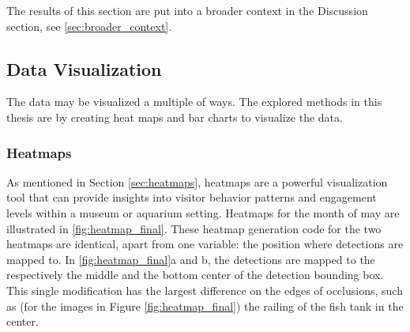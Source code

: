 The results of this section are put into a broader context in the Discussion section, see \ref{sec:broader_context}.

\subsection{Data Visualization}
\label{sec:data_visualization}
The data may be visualized a multiple of ways. The explored methods in this thesis are by creating heat maps and bar charts to visualize the data. 

\subsubsection{Heatmaps}
\label{sec:results_heatmaps}
As mentioned in Section \ref{sec:heatmaps}, heatmaps are a powerful visualization tool that can provide insights into visitor behavior patterns and engagement levels within a museum or aquarium setting. Heatmaps for the month of may are illustrated in \ref{fig:heatmap_final}. These heatmap generation code for the two heatmaps are identical, apart from one variable: the position where detections are mapped to. In \ref{fig:heatmap_final}a and b, the detections are mapped to the respectively the middle and the bottom center of the detection bounding box. This single modification has the largest difference on the edges of occlusions, such as (for the images in Figure \ref{fig:heatmap_final}) the railing of the fish tank in the center.


